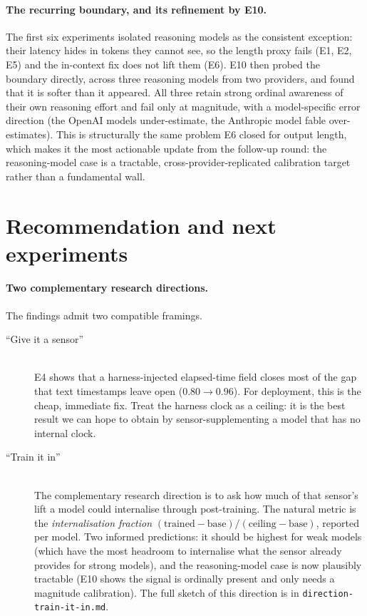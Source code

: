 \documentclass[11pt]{article}
\newcommand{\code}[1]{\texttt{\small #1}}
\begin{document}
\paragraph{The recurring boundary, and its refinement by E10.} The first six experiments
isolated reasoning models as the consistent exception: their latency hides in tokens they
cannot see, so the length proxy fails (E1, E2, E5) and the in-context fix does not lift them
(E6). E10 then probed the boundary directly, across three reasoning models from two providers,
and found that it is softer than it appeared. All three retain strong ordinal awareness of their
own reasoning effort and fail only at magnitude, with a model-specific error direction (the
OpenAI models under-estimate, the Anthropic model fable over-estimates). This is structurally the
same problem E6 closed for output length, which makes it the most actionable update from the
follow-up round: the reasoning-model case is a tractable, cross-provider-replicated calibration
target rather than a fundamental wall.

\section{Recommendation and next experiments}
\label{sec:next}

\paragraph{Two complementary research directions.} The findings admit two compatible framings.

\begin{description}
\item[``Give it a sensor'']\hfill\\
E4 shows that a harness-injected elapsed-time field closes most of the gap that text
timestamps leave open ($0.80 \to 0.96$). For deployment, this is the cheap, immediate fix.
Treat the harness clock as a ceiling: it is the best result we can hope to obtain by
sensor-supplementing a model that has no internal clock.

\item[``Train it in'']\hfill\\
The complementary research direction is to ask how much of that sensor's lift a model could
internalise through post-training. The natural metric is the
\emph{internalisation fraction} $(\mathrm{trained} - \mathrm{base}) / (\mathrm{ceiling} -
\mathrm{base})$, reported per model. Two informed predictions: it should be highest for weak
models (which have the most headroom to internalise what the sensor already provides for
strong models), and the reasoning-model case is now plausibly tractable (E10 shows the signal
is ordinally present and only needs a magnitude calibration). The full sketch of this
direction is in \code{direction-train-it-in.md}.
\end{description}
\end{document}
